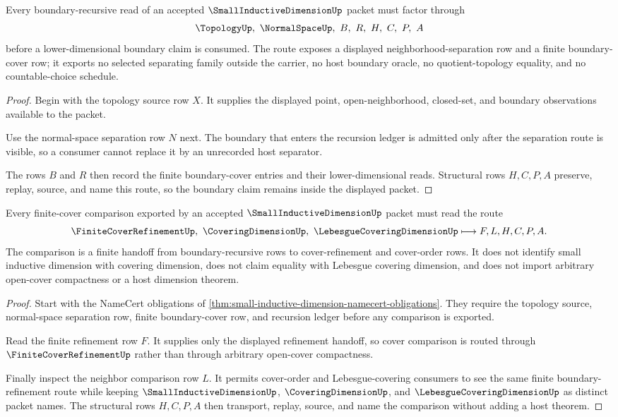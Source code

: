 \begin{theorem}
\label{thm:small-inductive-dimension-boundary-route}
Every boundary-recursive read of an accepted $\SmallInductiveDimensionUp$ packet must factor through
$$
\TopologyUp,\ \NormalSpaceUp,\ B,\ R,\ H,\ C,\ P,\ A
$$
before a lower-dimensional boundary claim is consumed. The route exposes a displayed neighborhood-separation row and a finite boundary-cover row; it exports no selected separating family outside the carrier, no host boundary oracle, no quotient-topology equality, and no countable-choice schedule.
\end{theorem}
\begin{proof}
Begin with the topology source row $X$. It supplies the displayed point, open-neighborhood, closed-set, and boundary observations available to the packet.

Use the normal-space separation row $N$ next. The boundary that enters the recursion ledger is admitted only after the separation route is visible, so a consumer cannot replace it by an unrecorded host separator.

The rows $B$ and $R$ then record the finite boundary-cover entries and their lower-dimensional reads. Structural rows $H,C,P,A$ preserve, replay, source, and name this route, so the boundary claim remains inside the displayed packet.
\end{proof}

\begin{theorem}
\label{thm:small-inductive-dimension-cover-comparison}
Every finite-cover comparison exported by an accepted $\SmallInductiveDimensionUp$ packet must read the route
$$
\FiniteCoverRefinementUp,\ \CoveringDimensionUp,\ \LebesgueCoveringDimensionUp
\longmapsto
F,L,H,C,P,A .
$$
The comparison is a finite handoff from boundary-recursive rows to cover-refinement and cover-order rows. It does not identify small inductive dimension with covering dimension, does not claim equality with Lebesgue covering dimension, and does not import arbitrary open-cover compactness or a host dimension theorem.
\end{theorem}
\begin{proof}
Start with the NameCert obligations of \autoref{thm:small-inductive-dimension-namecert-obligations}. They require the topology source, normal-space separation row, finite boundary-cover row, and recursion ledger before any comparison is exported.

Read the finite refinement row $F$. It supplies only the displayed refinement handoff, so cover comparison is routed through $\FiniteCoverRefinementUp$ rather than through arbitrary open-cover compactness.

Finally inspect the neighbor comparison row $L$. It permits cover-order and Lebesgue-covering consumers to see the same finite boundary-refinement route while keeping $\SmallInductiveDimensionUp$, $\CoveringDimensionUp$, and $\LebesgueCoveringDimensionUp$ as distinct packet names. The structural rows $H,C,P,A$ then transport, replay, source, and name the comparison without adding a host theorem.
\end{proof}

